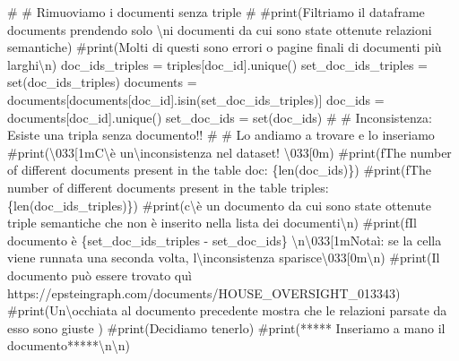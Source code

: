 \documentclass[
  italian,
  a4paper,
]{article}
\newenvironment{Shaded}{\begin{snugshade}}{\end{snugshade}}
\newcommand{\BuiltInTok}[1]{\textcolor[rgb]{0.00,0.23,0.31}{#1}}
\newcommand{\CommentTok}[1]{\textcolor[rgb]{0.37,0.37,0.37}{#1}}
\newcommand{\NormalTok}[1]{\textcolor[rgb]{0.00,0.23,0.31}{#1}}
\newcommand{\OperatorTok}[1]{\textcolor[rgb]{0.37,0.37,0.37}{#1}}
\newcommand{\StringTok}[1]{\textcolor[rgb]{0.13,0.47,0.30}{#1}}
\begin{document}
\begin{Shaded}
\begin{Highlighting}[]
\CommentTok{\#}
\CommentTok{\# Rimuoviamo i documenti senza triple}
\CommentTok{\#}
\CommentTok{\#print(\textquotesingle{}Filtriamo il dataframe documents prendendo solo \textbackslash{}ni documenti da cui sono state ottenute relazioni semantiche\textquotesingle{})}
\CommentTok{\#print(\textquotesingle{}Molti di questi sono errori o pagine finali di documenti più larghi\textbackslash{}n\textquotesingle{})}
\NormalTok{doc\_ids\_triples }\OperatorTok{=}\NormalTok{ triples[}\StringTok{\textquotesingle{}doc\_id\textquotesingle{}}\NormalTok{].unique()}
\NormalTok{set\_doc\_ids\_triples }\OperatorTok{=} \BuiltInTok{set}\NormalTok{(doc\_ids\_triples)}
\NormalTok{documents }\OperatorTok{=}\NormalTok{ documents[documents[}\StringTok{\textquotesingle{}doc\_id\textquotesingle{}}\NormalTok{].isin(set\_doc\_ids\_triples)]}
\NormalTok{doc\_ids }\OperatorTok{=}\NormalTok{ documents[}\StringTok{\textquotesingle{}doc\_id\textquotesingle{}}\NormalTok{].unique()}
\NormalTok{set\_doc\_ids }\OperatorTok{=} \BuiltInTok{set}\NormalTok{(doc\_ids)}
\CommentTok{\#}
\CommentTok{\# Inconsistenza: Esiste una tripla senza documento!!}
\CommentTok{\#}
\CommentTok{\# Lo andiamo a trovare e lo inseriamo}
\CommentTok{\#print(\textquotesingle{}\textbackslash{}033[1mC\textbackslash{}\textquotesingle{}è un\textbackslash{}inconsistenza nel dataset! \textbackslash{}033[0m\textquotesingle{})}
\CommentTok{\#print(f\textquotesingle{}The number of different documents present in the table doc: \{len(doc\_ids)\}\textquotesingle{})}
\CommentTok{\#print(f\textquotesingle{}The number of different documents present in the table triples: \{len(doc\_ids\_triples)\}\textquotesingle{})}
\CommentTok{\#print(\textquotesingle{}c\textbackslash{}\textquotesingle{}è un documento da cui sono state ottenute triple semantiche che non è inserito nella lista dei documenti\textbackslash{}n\textquotesingle{})}
\CommentTok{\#print(f\textquotesingle{}Il documento è \{set\_doc\_ids\_triples {-} set\_doc\_ids\} \textbackslash{}n\textbackslash{}033[1mNotaì: se la cella viene runnata una seconda volta, l\textbackslash{}\textquotesingle{}inconsistenza sparisce\textbackslash{}033[0m\textbackslash{}n\textquotesingle{})}
\CommentTok{\#print(\textquotesingle{}Il documento può essere trovato quì https://epsteingraph.com/documents/HOUSE\_OVERSIGHT\_013343\textquotesingle{})}
\CommentTok{\#print(\textquotesingle{}Un\textbackslash{}\textquotesingle{}occhiata al documento precedente mostra che le relazioni parsate da esso sono giuste \textquotesingle{})}
\CommentTok{\#print(\textquotesingle{}Decidiamo tenerlo\textquotesingle{})}
\CommentTok{\#print(\textquotesingle{}***** Inseriamo a mano il documento*****\textbackslash{}n\textbackslash{}n\textquotesingle{})}


\end{Highlighting}
\end{Shaded}
\end{document}
